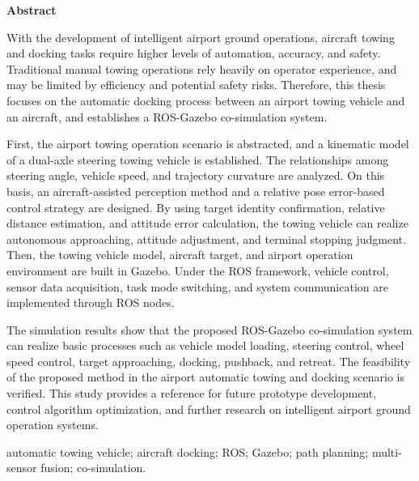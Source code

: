 
\begin{center}
{\bfseries{} Abstract}
\end{center}

With the development of intelligent airport ground operations, aircraft towing and docking tasks require higher levels of automation, accuracy, and safety. Traditional manual towing operations rely heavily on operator experience, and may be limited by efficiency and potential safety risks. Therefore, this thesis focuses on the automatic docking process between an airport towing vehicle and an aircraft, and establishes a ROS-Gazebo co-simulation system.

First, the airport towing operation scenario is abstracted, and a kinematic model of a dual-axle steering towing vehicle is established. The relationships among steering angle, vehicle speed, and trajectory curvature are analyzed. On this basis, an aircraft-assisted perception method and a relative pose error-based control strategy are designed. By using target identity confirmation, relative distance estimation, and attitude error calculation, the towing vehicle can realize autonomous approaching, attitude adjustment, and terminal stopping judgment. Then, the towing vehicle model, aircraft target, and airport operation environment are built in Gazebo. Under the ROS framework, vehicle control, sensor data acquisition, task mode switching, and system communication are implemented through ROS nodes.

The simulation results show that the proposed ROS-Gazebo co-simulation system can realize basic processes such as vehicle model loading, steering control, wheel speed control, target approaching, docking, pushback, and retreat. The feasibility of the proposed method in the airport automatic towing and docking scenario is verified. This study provides a reference for future prototype development, control algorithm optimization, and further research on intelligent airport ground operation systems.

\vspace{1em}
 automatic towing vehicle; aircraft docking; ROS; Gazebo; path planning; multi-sensor fusion; co-simulation.
